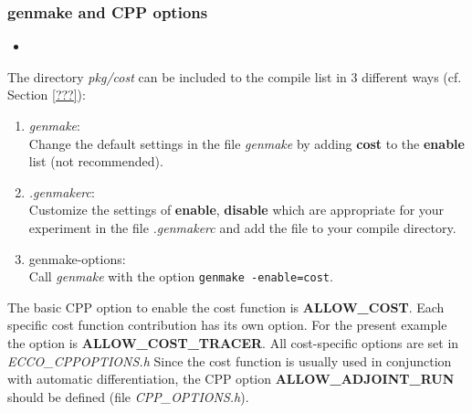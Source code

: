 \subsubsection{genmake and CPP options}
%
\begin{itemize}
%
\item 
{}
\end{itemize}
%
The directory {\it pkg/cost} can be included to the
compile list in 3 different ways (cf. Section \ref{???}):
%
\begin{enumerate}
%
\item {\it genmake}: \\
Change the default settings in the file {\it genmake} by adding 
{\bf cost} to the {\bf enable} list (not recommended).
%
\item {\it .genmakerc}: \\
Customize the settings of {\bf enable}, {\bf disable} which are
appropriate for your experiment in the file {\it .genmakerc} 
and add the file to your compile directory.
%
\item genmake-options: \\
Call {\it genmake} with the option
{\tt genmake -enable=cost}.
%
\end{enumerate}
The basic CPP option to enable the cost function is {\bf ALLOW\_COST}.
Each specific cost function contribution has its own option.
For the present example the option is {\bf ALLOW\_COST\_TRACER}.
All cost-specific options are set in {\it ECCO\_CPPOPTIONS.h}
Since the cost function is usually used in conjunction with
automatic differentiation, the CPP option
{\bf ALLOW\_ADJOINT\_RUN} should be defined
(file {\it CPP\_OPTIONS.h}).

